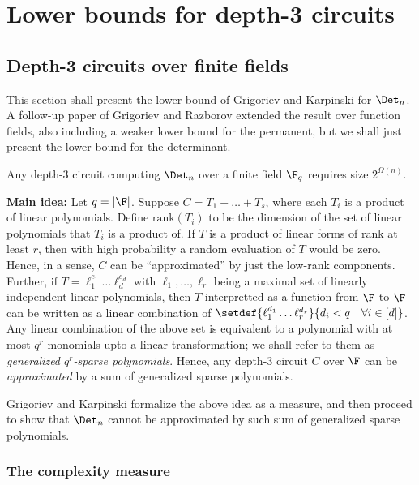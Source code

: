 \section{Lower bounds for depth-3 circuits}

\subsection{Depth-3 circuits over finite fields}

This section shall present the lower bound of Grigoriev and Karpinski
\cite{grigoriev98} for $\Det_n$. A follow-up paper of Grigoriev and
Razborov \cite{gr00} extended the result over function fields, also
including a weaker lower bound for the permanent, but we shall just
present the lower bound for the determinant.

\begin{theorem}\cite{grigoriev98}\label{thm:gk-main-thm}
  Any depth-3 circuit computing $\Det_n$ over a finite field $\F_q$
  requires size $2^{\Omega(n)}$.
\end{theorem}

{\bf Main idea:} Let $q = |\F|$. Suppose $C = T_1 + \dots + T_s$,
where each $T_i$ is a product of linear polynomials. Define
$\mathrm{rank}(T_i)$ to be the dimension of the set of linear
polynomials that $T_i$ is a product of. If $T$ is a product of linear
forms of rank at least $r$, then with high probability a random
evaluation of $T$ would be zero. Hence, in a sense, $C$ can be
``approximated'' by just the low-rank components. Further, if $T =
\ell_1^{e_1} \dots \ell_d^{e_d}$ with $\ell_1,\dots, \ell_r$ being a
maximal set of linearly independent linear polynomials, then $T$
interpretted as a function from $\F$ to $\F$ can be written as a
linear combination of $\setdef{\ell_1^{d_1}\dots\ell_r^{d_r}}{d_i < q
  \quad \forall i\in [d]}$. Any linear combination of the above set is
equivalent to a polynomial with at most $q^r$ monomials upto a linear
transformation; we shall refer to them as \emph{generalized
  $q^r$-sparse polynomials}. Hence, any depth-3 circuit $C$ over $\F$
can be \emph{approximated} by a sum of generalized sparse polynomials. 

Grigoriev and Karpinski \cite{grigoriev98} formalize the above idea as
a measure, and then proceed to show that $\Det_n$ cannot be
approximated by such sum of generalized sparse polynomials.

\subsubsection{The complexity measure}

